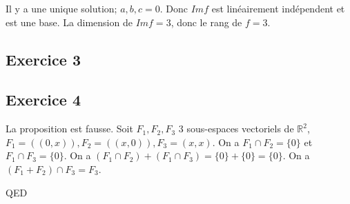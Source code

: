 \documentclass[]{book}
\theoremstyle{definition}
\newcommand{\bb}[1]{\mathbb{#1}}
\newcommand{\R}{\bb{R}}
\begin{document}
Il y a une unique solution; $a,b,c = 0$. Donc $Im f$ est lin\'eairement ind\'ependent et est une base.
La dimension de $Im f = 3$, donc le rang de $f = 3$.

\subsection*{Exercice 3}



\subsection*{Exercice 4}
La proposition est fausse. Soit $F_1,F_2,F_3$ 3 sous-espaces vectoriels de $\R^2$, $F_1=((0,x)), F_2=((x,0)), F_3=(x,x)$. On a $F_1 \cap F_2 = \{0\}$ et $F_1 \cap F_3 = \{0\}$. On a $(F_1 \cap F_2) + (F_1 \cap F_3) = \{0\} + \{0\} = \{0\}$. On a $(F_1 + F_2) \cap F_3 = F_3$.


QED
\end{document}
